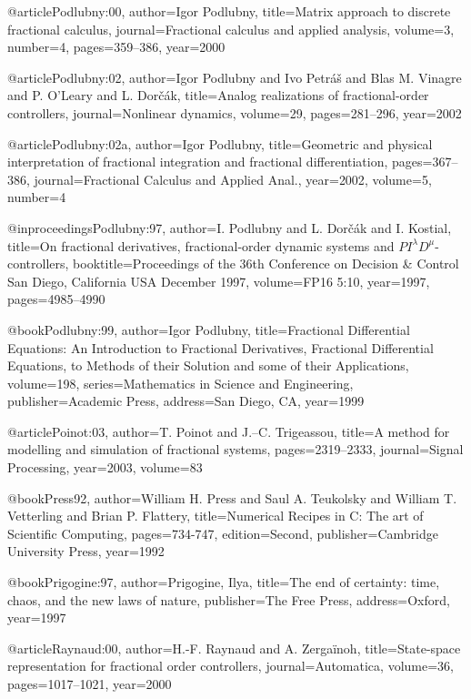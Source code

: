 \begin{thebibliography}{99}
@article{Podlubny:00,
  author={Igor Podlubny},
  title={Matrix approach to discrete fractional calculus},
  journal={Fractional calculus and applied analysis},
  volume={3},
  number={4},
  pages={359--386},
  year={2000}
}

@article{Podlubny:02,
  author={Igor Podlubny and Ivo Petr{\'{a}}{\v{s}} and Blas M. Vinagre and P. O'Leary
    and L. Dor{\v{c}}{\'a}k},
  title={Analog realizations of fractional{-}order controllers},
  journal={Nonlinear dynamics},
  volume={29},
  pages={281--296},
  year={2002}
}

@article{Podlubny:02a,
  author={Igor Podlubny},
  title={Geometric and physical interpretation of fractional integration and fractional
    differentiation},
  pages={367--386},
  journal={Fractional Calculus and Applied Anal.},
  year={2002},
  volume={5},
  number={4}
}

@inproceedings{Podlubny:97,
  author={I. Podlubny and L. Dor{\v{c}}{\'a}k and I. Kostial},
  title={On fractional derivatives, fractional-order dynamic systems and {$P I^{\lambda}
    D^{\mu}$}-controllers},
  booktitle={Proceedings of the 36th Conference on Decision {\&} Control San Diego,
    California USA December 1997},
  volume={FP16 5:10},
  year={1997},
  pages={4985--4990}
}

@book{Podlubny:99,
  author={Igor Podlubny},
  title={Fractional Differential Equations: An Introduction to Fractional Derivatives,
    Fractional Differential Equations, to Methods of their Solution and some of
    their Applications},
  volume={198},
  series={Mathematics in Science and Engineering},
  publisher={Academic Press},
  address={San Diego, CA},
  year={1999}
}

@article{Poinot:03,
  author={T. Poinot and J.--C. Trigeassou},
  title={A method for modelling and simulation of fractional systems},
  pages={2319--2333},
  journal={Signal Processing},
  year={2003},
  volume={83}
}

@book{Press92,
  author={William H. Press and Saul A. Teukolsky and William T. Vetterling and
    Brian P. Flattery},
  title={Numerical Recipes in C: The art of Scientific Computing},
  pages={734-747},
  edition={Second},
  publisher={Cambridge University Press},
  year={1992}
}

@book{Prigogine:97,
  author={Prigogine, Ilya},
  title={The end of certainty: time, chaos, and the new laws of nature},
  publisher={The Free Press},
  address={Oxford},
  year={1997}
}

@article{Raynaud:00,
  author={H.-F. Raynaud and A. Zerga{\"i}noh},
  title={State-space representation for fractional order controllers},
  journal={Automatica},
  volume={36},
  pages={1017--1021},
  year={2000}
}


\end{thebibliography}
